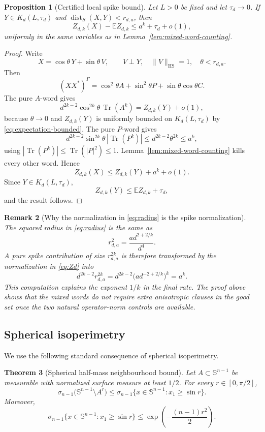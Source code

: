 \documentclass[11pt]{article}
\newtheorem{theorem}{Theorem}[section]
\newtheorem{proposition}[theorem]{Proposition}
\newtheorem{remark}[theorem]{Remark}
\DeclareMathOperator{\Tr}{Tr}
\DeclareMathOperator{\dist}{dist}
\newcommand{\HS}{\mathrm{HS}}
\newcommand{\E}{\mathbb E}
\newcommand{\Sphere}{\mathbb S}
\begin{document}
\begin{proposition}[Certified local spike bound]\label{prop:certified-local-spike}
Let \(L>0\) be fixed and let \(\tau_d\to0\).  If \(Y\in K_d(L,\tau_d)\) and
\(\dist_S(X,Y)<r_{d,a}\), then
\[
  Z_{d,k}(X)-\E Z_{d,k}\le a^k+\tau_d+o(1),
\]
uniformly in the same variables as in Lemma~\ref{lem:mixed-word-counting}.
\end{proposition}

\begin{proof}
Write
\[
  X=\cos\theta\,Y+\sin\theta\,V,
  \qquad
  V\perp Y,\quad \|V\|_{\HS}=1,\quad \theta<r_{d,a}.
\]
Then
\[
  (XX^*)^\Gamma
  =\cos^2\theta A+\sin^2\theta P+\sin\theta\cos\theta C.
\]
The pure \(A\)-word gives
\[
  d^{2k-2}\cos^{2k}\theta\,\Tr(A^k)
  =Z_{d,k}(Y)+o(1),
\]
because \(\theta\to0\) and \(Z_{d,k}(Y)\) is uniformly bounded on
\(K_d(L,\tau_d)\) by \eqref{eq:expectation-bounded}.  The pure \(P\)-word gives
\[
  d^{2k-2}\sin^{2k}\theta\,|\Tr(P^k)|
  \le d^{2k-2}\theta^{2k}
  \le a^k,
\]
using \(|\Tr(P^k)|\le\Tr(|P|^2)\le1\).  Lemma~\ref{lem:mixed-word-counting}
kills every other word.  Hence
\[
  Z_{d,k}(X)\le Z_{d,k}(Y)+a^k+o(1).
\]
Since \(Y\in K_d(L,\tau_d)\),
\[
  Z_{d,k}(Y)\le \E Z_{d,k}+\tau_d,
\]
and the result follows.
\end{proof}

\begin{remark}[Why the normalization in \eqref{eq:radius} is the spike normalization]
The squared radius in \eqref{eq:radius} is the same as
\[
  r_{d,a}^2=\frac{a d^{2+2/k}}{d^4}.
\]
A pure spike contribution of size \(r_{d,a}^{2k}\) is therefore transformed by the normalization in \eqref{eq:Zd} into
\[
  d^{2k-2}r_{d,a}^{2k}
  =d^{2k-2}\bigl(a d^{-2+2/k}\bigr)^k
  =a^k.
\]
This computation explains the exponent \(1/k\) in the final rate.  The proof
above shows that the mixed words do not require extra anisotropic clauses in
the good set once the two natural operator-norm controls are available.
\end{remark}

\subsection{Spherical isoperimetry}

We use the following standard consequence of spherical isoperimetry.

\begin{theorem}[Spherical half-mass neighbourhood bound]\label{thm:spherical-iso}
Let $A\subset \Sphere^{n-1}$ be measurable with normalized surface measure at least $1/2$.  For every $r\in[0,\pi/2]$,
\begin{equation}\label{eq:iso}
  \sigma_{n-1}\bigl(\Sphere^{n-1}\setminus A^r\bigr)
  \le \sigma_{n-1}\{x\in\Sphere^{n-1}:x_1\ge \sin r\}.
\end{equation}
Moreover,
\begin{equation}\label{eq:cap-tail}
  \sigma_{n-1}\{x\in\Sphere^{n-1}:x_1\ge \sin r\}
  \le \exp\left(-\frac{(n-1)r^2}{2}\right).
\end{equation}
\end{theorem}
\end{document}
